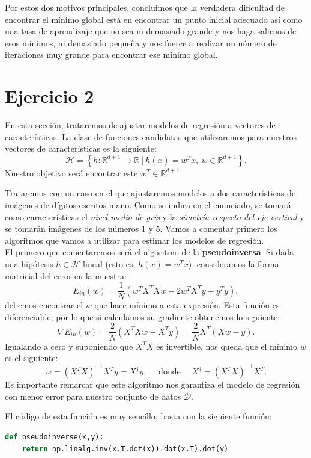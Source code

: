\documentclass[12pt]{scrartcl}
\begin{document}
{Por estos dos motivos principales, concluimos que la verdadera dificultad de encontrar el mínimo global está en encontrar un punto inicial adecuado así como una tasa de aprendizaje que no sea ni demasiado grande y nos haga salirnos de esos mínimos, ni demasiado pequeña y nos fuerce
a realizar un número de iteraciones muy grande para encontrar ese mínimo global.

\newpage 

\section*{Ejercicio 2}

En esta sección, trataremos de ajustar modelos de regresión a vectores de características. La clase de funciones candidatas que utilizaremos para nuestros vectores de características es la siguiente:
$$
\mathcal H = \left\{ h : \mathbb R^{d+1} \to \mathbb R \ | \ h(x)= w^T x, \ w \in \mathbb R^{d+1}\right\}.
$$
Nuestro objetivo será encontrar este $w^T \in \mathbb R^{d+1}$


Trataremos con un caso en el que ajustaremos modelos a dos características
de imágenes de dígitos escritos mano. Como se indica en el enunciado, se tomará como características el \emph{nivel medio de gris} y la \emph{simetría respecto del eje vertical} y se tomarán imágenes de los
números $1$ y $5$. Vamos a comentar primero los algoritmos que vamos a utilizar para estimar los modelos de regresión.\\ 


El primero que comentaremos será el algoritmo de la \textbf{pseudoinversa}. Si dada una hipótesis $h \in \mathcal H$ lineal (esto es, $h(x) = w^T x$), consideramos la forma matricial del error en la muestra:
$$
E_{in}(w) = \frac{1}{N} \left(  w^T X^T X w - 2w^T X^T y + y^T y\right),
$$
debemos encontrar el $w$ que hace mínimo a esta expresión. Esta función es diferenciable, por lo que si calculamos su gradiente obtenemos lo siguiente:
$$
\nabla E_{in}(w) = \frac{2}{N} \left( X^T X w - X^T y\right) = \frac{2}{N} X^T \left(  X w -  y\right).
$$
Igualando a cero y suponiendo que $X^T X$ es invertible, nos queda que el mínimo $w$ es el siguiente:
$$
w = \left(X^T X\right)^{-1} X^T y = X^\dagger y, \quad \text{ donde } \quad X^\dagger = \left(X^T X\right)^{-1} X^T.
$$
Es importante remarcar que este algoritmo nos garantiza el modelo de regresión con menor error para nuestro conjunto de datos $\mathcal D$. 

El código de esta función es muy sencillo, basta con la siguiente función:
\begin{lstlisting}[language=Python]
def pseudoinverse(x,y):
	return np.linalg.inv(x.T.dot(x)).dot(x.T).dot(y)
\end{lstlisting}

}
\end{document}
